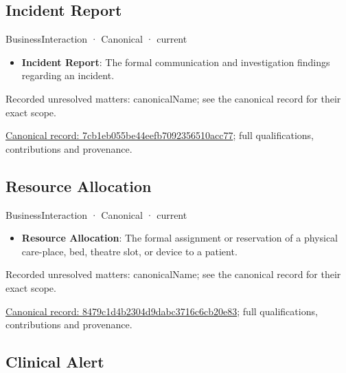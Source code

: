 \subsection{Incident Report}

\label{element:7cb1eb055be44eefb7092356510acc77}
{\small BusinessInteraction · Canonical · current}\par

\begin{itemize}


\item \textbf{Incident Report}: The formal communication and investigation findings regarding an incident.

\end{itemize}

{\small Recorded unresolved matters: canonicalName; see the canonical record for their exact scope.}\par
{\footnotesize \href{../../../../continuum/business/business-interaction/7cb1eb055be44eefb7092356510acc77.md}{Canonical record: 7cb1eb055be44eefb7092356510acc77}; full qualifications, contributions and provenance.}\par
\subsection{Resource Allocation}

\label{element:8479c1d4b2304d9dabc3716c6cb20e83}
{\small BusinessInteraction · Canonical · current}\par

\begin{itemize}


\item \textbf{Resource Allocation}: The formal assignment or reservation of a physical care-place, bed, theatre slot, or device to a patient.

\end{itemize}

{\small Recorded unresolved matters: canonicalName; see the canonical record for their exact scope.}\par
{\footnotesize \href{../../../../continuum/business/business-interaction/8479c1d4b2304d9dabc3716c6cb20e83.md}{Canonical record: 8479c1d4b2304d9dabc3716c6cb20e83}; full qualifications, contributions and provenance.}\par
\subsection{Clinical Alert}

